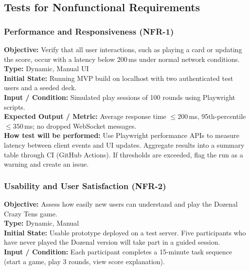 \documentclass[12pt, titlepage]{article}
\begin{document}
\subsection{Tests for Nonfunctional Requirements}

    \subsubsection{Performance and Responsiveness (NFR-1)}
    \textbf{Objective:} Verify that all user interactions, such as playing a card or updating the score, occur with a latency below 200\,ms under normal network conditions. \\

    \textbf{Type:} Dynamic, Manual UI \\

    \textbf{Initial State:} Running MVP build on localhost with two authenticated test users and a seeded deck. \\

    \textbf{Input / Condition:} Simulated play sessions of 100 rounds using Playwright scripts. \\

    \textbf{Expected Output / Metric:} Average response time $\leq 200$\,ms, 95th-percentile $\leq 350$\,ms; no dropped WebSocket messages. \\

    \textbf{How test will be performed:}
    Use Playwright performance APIs to measure latency between client events and UI updates. Aggregate results into a summary table through CI (GitHub Actions).
    If thresholds are exceeded, flag the run as a warning and create an issue.

    \subsubsection{Usability and User Satisfaction (NFR-2)}
    \textbf{Objective:} Assess how easily new users can understand and play the Dozenal Crazy Tens game. \\

    \textbf{Type:} Dynamic, Manual \\

    \textbf{Initial State:} Usable prototype deployed on a test server. Five participants who have never played the Dozenal version will take part in a guided session. \\

    \textbf{Input / Condition:} Each participant completes a 15-minute task sequence (start a game, play 3 rounds, view score explanation). \\
\end{document}
